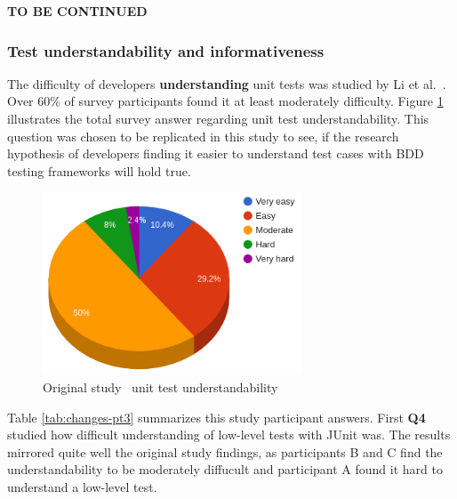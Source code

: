 \textbf{TO BE CONTINUED}
\clearpage
\subsubsection{Test understandability and informativeness }
The difficulty of developers \textbf{understanding} unit tests was studied by Li et al.~\cite{li2016automatically}. Over 60\% of survey
participants found it at least moderately difficulty. Figure \ref{fig:org-understandability} illustrates the total survey
answer regarding unit test understandability. This question was chosen to be replicated in this study to see, if the research
hypothesis of developers finding it easier to understand test cases with BDD testing frameworks will hold true.

    \begin{figure}[ht]
      \begin{center}
        \includegraphics[width=7.7cm]{images/org-understandability.png}
        \caption{Original study~\cite{li2016automatically} unit test understandability}
        \label{fig:org-understandability}
      \end{center}
    \end{figure}

Table \ref{tab:changes-pt3} summarizes this study participant answers. First \textbf{Q4} studied how difficult understanding
of low-level tests with JUnit was. The results mirrored quite well the original study findings, as participants B and C
find the understandability to be moderately diffucult and participant A found it hard to understand a low-level test.



